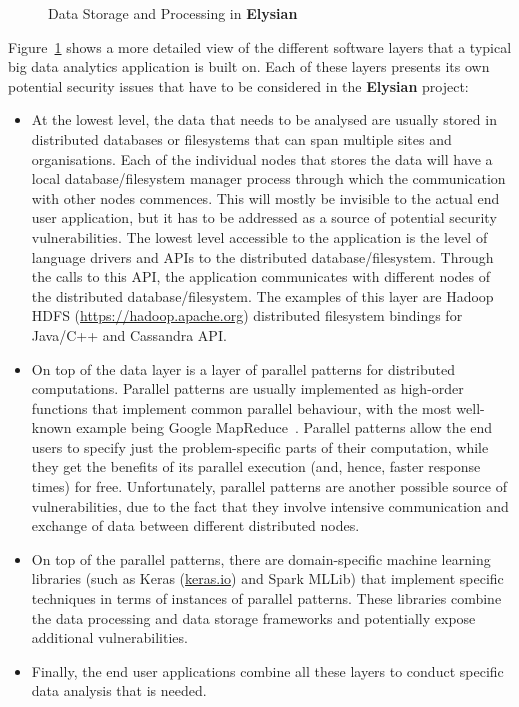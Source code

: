 \documentclass[a4paper,11pt]{article}
\newcommand{\project}[1]{\textbf{#1}\xspace}
\newcommand{\SECURITY}{\project{Elysian}}
\newcommand{\TheProject}{\SECURITY}
\begin{document}
\begin{figure}[tph!]
  \begin{center}
  \vspace{-19mm}
  \vspace{-2.3cm}
  \caption{Data Storage and Processing in \TheProject{}}
  \label{fig:storageprocessing}
  \end{center}
  \end{figure}

Figure~\ref{fig:storageprocessing} shows a more detailed view of the different software layers that a typical big data analytics application is built on. Each of these layers presents its own potential security issues that have to be considered in the \TheProject{} project: 
\begin{itemize}
\item At the lowest level, the data that needs to be analysed are usually stored in distributed databases or filesystems that can span multiple sites and organisations. Each of the individual nodes that stores the data will have a local database/filesystem manager process through which the communication with other nodes commences. This will mostly be invisible to the actual end user application, but it has to be addressed as a source of potential security vulnerabilities. The lowest level accessible to the application is the level of language drivers and APIs to the distributed database/filesystem. Through the calls to this API, the application communicates with different nodes of the distributed database/filesystem. The examples of this layer are Hadoop HDFS (\url{https://hadoop.apache.org}) distributed filesystem bindings for Java/C++ and Cassandra API. 
\item On top of the data layer is a layer of parallel patterns for distributed computations. Parallel patterns are usually implemented as high-order functions that implement common parallel behaviour, with the most well-known example being Google MapReduce~\cite{mapreduce}. Parallel patterns allow the end users to specify just the problem-specific parts of their computation, while they get the benefits of its parallel execution (and, hence, faster response times) for free. Unfortunately, parallel patterns are another possible source of vulnerabilities, due to the fact that they involve intensive communication and exchange of data between different distributed nodes. 
\item On top of the parallel patterns, there are domain-specific machine learning libraries (such as Keras (\url{keras.io}) and Spark MLLib) that implement specific %
techniques in terms of instances of parallel patterns. These libraries combine the data processing and data storage frameworks and potentially expose additional vulnerabilities. 
\item Finally, the end user applications combine all these layers to conduct specific data analysis that is needed. 
\end{itemize}
\end{document}
